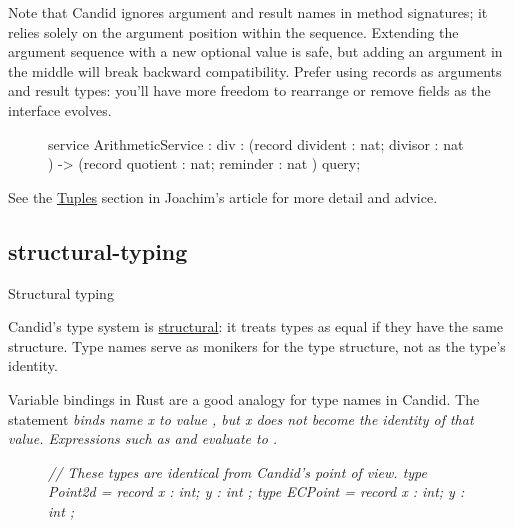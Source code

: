 \documentclass{article}
\begin{document}
Note that Candid ignores argument and result names in method signatures; it relies solely on the argument position within the sequence.
Extending the argument sequence with a new optional value is safe, but adding an argument in the middle will break backward compatibility.
Prefer using records as arguments and result types: you'll have more freedom to rearrange or remove fields as the interface evolves.

\begin{figure}
\begin{code}[candid]
service ArithmeticService : {
  div : (record { divident : nat; divisor : nat })
     -> (record { quotient : nat; reminder : nat }) query;
}
\end{code}
\end{figure}

See the \href{https://www.joachim-breitner.de/blog/786-A_Candid_explainer__Quirks#tuples}{Tuples} section in Joachim's article for more detail and advice.

\subsection{structural-typing}{Structural typing}

Candid's type system is \href{https://en.wikipedia.org/wiki/Structural_type_system}{structural}: it treats types as equal if they have the same structure.
Type names serve as monikers for the type structure, not as the type's identity.

Variable bindings in Rust are a good analogy for type names in Candid.
The  statement \em{binds} name \em{x} to value , but \em{x} does not become the identity of that value.
Expressions such as  and  evaluate to .

\begin{figure}

\begin{code}[candid]
\em{// These types are identical from Candid's point of view.}
type Point2d = record { x : int; y : int };
type ECPoint = record { x : int; y : int };
\end{code}
\end{figure}
\end{document}
